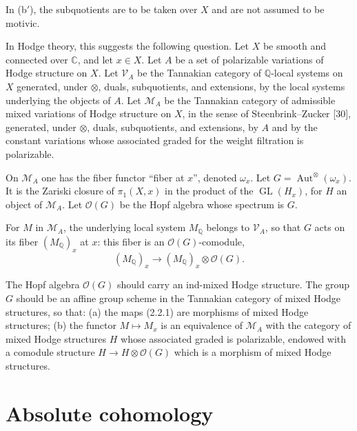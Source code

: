 \documentclass[11pt,a4paper]{article}
\theoremstyle{plain}
\theoremstyle{definition}
\DeclareMathOperator{\Aut}{Aut}
\DeclareMathOperator{\GL}{GL}
\newcommand{\Q}{\mathbb{Q}}
\newcommand{\C}{\mathbb{C}}
\begin{document}
In (b$'$), the subquotients are to be taken over $X$ and are not assumed to be motivic.

In Hodge theory, this suggests the following question. Let $X$ be smooth and connected over $\C$, and let $x\in X$. Let $A$ be a set of polarizable variations of Hodge structure on $X$. Let $\mathscr{V}_A$ be the Tannakian category of $\Q$-local systems on $X$ generated, under $\otimes$, duals, subquotients, and extensions, by the local systems underlying the objects of $A$. Let $\mathcal{M}_A$ be the Tannakian category of admissible mixed variations of Hodge structure on $X$, in the sense of Steenbrink--Zucker [30], generated, under $\otimes$, duals, subquotients, and extensions, by $A$ and by the constant variations whose associated graded for the weight filtration is polarizable.

On $\mathcal{M}_A$ one has the fiber functor ``fiber at $x$'', denoted $\omega_x$. Let $G=\Aut^{\otimes}(\omega_x)$. It is the Zariski closure of $\pi_1(X,x)$ in the product of the $\GL(H_x)$, for $H$ an object of $\mathcal{M}_A$. Let $\mathcal{O}(G)$ be the Hopf algebra whose spectrum is $G$.

For $M$ in $\mathcal{M}_A$, the underlying local system $M_{\Q}$ belongs to $\mathscr{V}_A$, so that $G$ acts on its fiber $(M_{\Q})_x$ at $x$: this fiber is an $\mathcal{O}(G)$-comodule,
\begin{equation}
\tag{2.2.1}
(M_{\Q})_x\to (M_{\Q})_x\otimes \mathcal{O}(G).
\end{equation}

The Hopf algebra $\mathcal{O}(G)$ should carry an ind-mixed Hodge structure. The group $G$ should be an affine group scheme in the Tannakian category of mixed Hodge structures, so that: (a) the maps (2.2.1) are morphisms of mixed Hodge structures; (b) the functor $M\mapsto M_x$ is an equivalence of $\mathcal{M}_A$ with the category of mixed Hodge structures $H$ whose associated graded is polarizable, endowed with a comodule structure $H\to H\otimes\mathcal{O}(G)$ which is a morphism of mixed Hodge structures.

\section{Absolute cohomology}

\subsection{}
\end{document}
